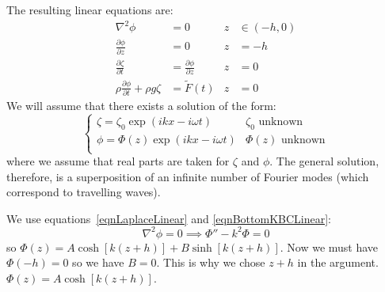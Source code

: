 \documentclass[../Main.tex]{subfiles}
\begin{document}
The resulting linear equations are:
\begin{align}
    \nabla^2 \phi &= 0 & z &\in (-h, 0) \label{eqnLaplaceLinear} \\
    \frac{\partial \phi}{\partial z} &= 0 & z &= -h \label{eqnBottomKBCLinear} \\
    \frac{\partial \zeta}{\partial t} &= \frac{\partial \phi}{\partial z} & z &= 0 \label{eqnFreeSurfaceKBCLinear} \\
    \rho \frac{\partial \phi}{\partial t} + \rho g \zeta &= \tilde{F}(t) & z &= 0 \label{eqnFreeSurfaceDBCLinear}
\end{align}
We will assume that there exists a solution of the form:
\begin{equation*}
    \begin{cases}
        \zeta = \zeta_0 \exp(ikx - i\omega t) & \zeta_0 \text{ unknown} \\
        \phi = \Phi(z) \exp(ikx - i\omega t) & \Phi(z) \text{ unknown} \\
    \end{cases}
\end{equation*}
where we assume that real parts are taken for $\zeta$ and $\phi$. The general solution, therefore, is a superposition of an infinite number of Fourier modes (which correspond to travelling waves).

We use equations~\ref{eqnLaplaceLinear} and \ref{eqnBottomKBCLinear}:
\begin{equation*}
    \nabla^2 \phi = 0 \implies \Phi'' - k^2 \Phi = 0
\end{equation*}
so $\Phi(z) = A\cosh [k(z+h)] + B\sinh [k(z+h)]$. Now we must have $\Phi(-h) = 0$ so we have $B = 0$. This is why we chose $z + h$ in the argument. $\Phi(z) = A\cosh[k(z+h)]$.
\end{document}
